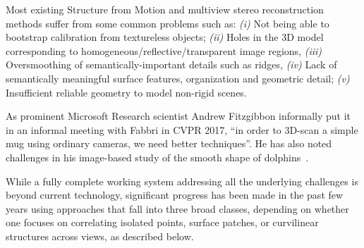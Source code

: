 Most existing Structure from Motion and multiview stereo reconstruction methods
suffer from some common problems such as: \emph{(i)} Not being able to bootstrap
calibration from textureless objects; {\em (ii)} Holes in the 3D model
corresponding to homogeneous/reflective/transparent image regions, {\em (iii)}
Oversmoothing of semantically-important details such as ridges, {\em (iv)} Lack
of semantically meaningful surface features, organization and geometric detail;
{\em (v)} Insufficient reliable geometry to model non-rigid scenes.

As prominent Microsoft Research scientist Andrew Fitzgibbon informally put it in
an informal meeting with Fabbri in CVPR 2017, ``in order to 3D-scan a simple mug
using ordinary cameras, we need better techniques''. He has also noted challenges in his image-based
study of the smooth shape of dolphins~\cite{Fitzgibbon:PAMI:dolphincs}. 

While a fully complete working system addressing all the underlying challenges
is beyond current technology, significant progress has been made in the past few
years using approaches that fall into three broad classes, depending on whether
one focuses on correlating isolated points, surface patches, or curvilinear
structures across views, as described below.


